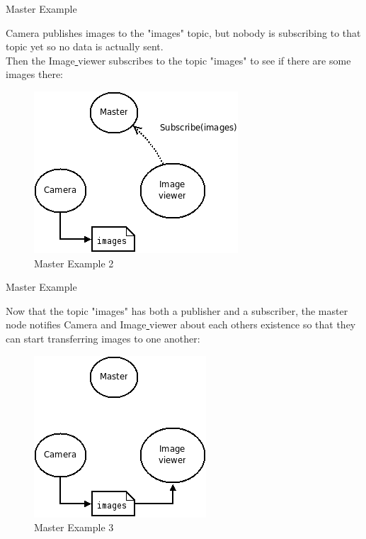\documentclass{beamer}
\begin{document}
\begin{frame}{Master Example}
	
	Camera publishes images to the "images" topic, but nobody is subscribing to that topic yet so no data is actually sent. \\ 
	Then the Image\underline{ }viewer subscribes to the topic "images" to see if there are some images there: 
	
	\begin{figure}[H]
		\centering
		\includegraphics[scale=0.6]{ROS_master_example_english_2.png}
		\caption{Master Example 2}
		\label{fig:ros_master_example_2}
	\end{figure}
	
	
\end{frame}

\begin{frame}{Master Example}
	
	Now that the topic "images" has both a publisher and a subscriber, the master node notifies Camera and Image\underline{ }viewer about each others existence so that they can start transferring images to one another: 
	
	\begin{figure}[H]
		\centering
		\includegraphics[scale=0.65]{ROS_master_example_english_3.png}
		\caption{Master Example 3}
		\label{fig:ros_master_example_3}
	\end{figure}
	
	
\end{frame}
\end{document}
